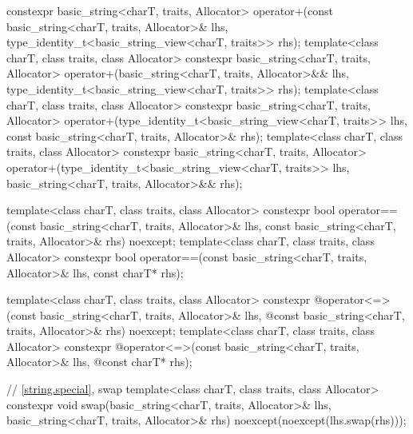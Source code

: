 \begin{codeblock}
{    constexpr basic_string<charT, traits, Allocator>
      operator+(const basic_string<charT, traits, Allocator>& lhs,
                type_identity_t<basic_string_view<charT, traits>> rhs);
  template<class charT, class traits, class Allocator>
    constexpr basic_string<charT, traits, Allocator>
      operator+(basic_string<charT, traits, Allocator>&& lhs,
                type_identity_t<basic_string_view<charT, traits>> rhs);
  template<class charT, class traits, class Allocator>
    constexpr basic_string<charT, traits, Allocator>
      operator+(type_identity_t<basic_string_view<charT, traits>> lhs,
                const basic_string<charT, traits, Allocator>& rhs);
  template<class charT, class traits, class Allocator>
    constexpr basic_string<charT, traits, Allocator>
      operator+(type_identity_t<basic_string_view<charT, traits>> lhs,
                basic_string<charT, traits, Allocator>&& rhs);

  template<class charT, class traits, class Allocator>
    constexpr bool
      operator==(const basic_string<charT, traits, Allocator>& lhs,
                 const basic_string<charT, traits, Allocator>& rhs) noexcept;
  template<class charT, class traits, class Allocator>
    constexpr bool operator==(const basic_string<charT, traits, Allocator>& lhs,
                              const charT* rhs);

  template<class charT, class traits, class Allocator>
    constexpr @\seebelow@ operator<=>(const basic_string<charT, traits, Allocator>& lhs,
              @\itcorr@                      const basic_string<charT, traits, Allocator>& rhs) noexcept;
  template<class charT, class traits, class Allocator>
    constexpr @\seebelow@ operator<=>(const basic_string<charT, traits, Allocator>& lhs,
              @\itcorr@                      const charT* rhs);

  // \ref{string.special}, swap
  template<class charT, class traits, class Allocator>
    constexpr void
      swap(basic_string<charT, traits, Allocator>& lhs,
           basic_string<charT, traits, Allocator>& rhs)
        noexcept(noexcept(lhs.swap(rhs)));

}
\end{codeblock}

